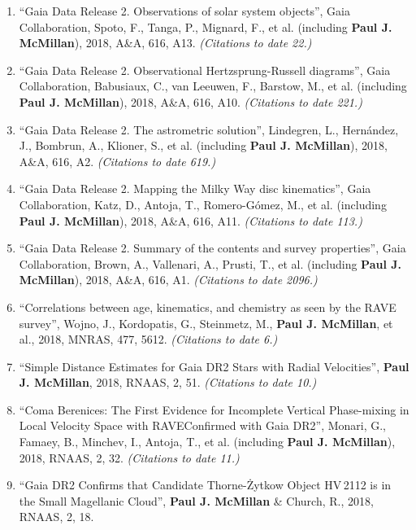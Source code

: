\documentclass{resume}
\begin{document}
\begin{enumerate}
\item ``Gaia Data Release 2. Observations of solar system objects'', Gaia Collaboration, Spoto, F., Tanga, P., Mignard, F., et al. (including \textbf{Paul J. McMillan}), 2018, A\&A, 616, A13. \textit{(Citations to date 22.)}

\item ``Gaia Data Release 2. Observational Hertzsprung-Russell diagrams'', Gaia Collaboration, Babusiaux, C., van Leeuwen, F., Barstow, M., et al. (including \textbf{Paul J. McMillan}), 2018, A\&A, 616, A10. \textit{(Citations to date 221.)}

\item ``Gaia Data Release 2. The astrometric solution'', Lindegren, L., Hern\'andez, J., Bombrun, A., Klioner, S., et al. (including \textbf{Paul J. McMillan}), 2018, A\&A, 616, A2. \textit{(Citations to date 619.)}

\item ``Gaia Data Release 2. Mapping the Milky Way disc kinematics'', Gaia Collaboration, Katz, D., Antoja, T., Romero-G\'omez, M., et al. (including \textbf{Paul J. McMillan}), 2018, A\&A, 616, A11. \textit{(Citations to date 113.)}

\item ``Gaia Data Release 2. Summary of the contents and survey properties'', Gaia Collaboration, Brown, A., Vallenari, A., Prusti, T., et al. (including \textbf{Paul J. McMillan}), 2018, A\&A, 616, A1. \textit{(Citations to date 2096.)}

\item ``Correlations between age, kinematics, and chemistry as seen by the RAVE survey'', Wojno, J., Kordopatis, G., Steinmetz, M., \textbf{Paul J. McMillan}, et al., 2018, MNRAS, 477, 5612. \textit{(Citations to date 6.)}

\item ``Simple Distance Estimates for Gaia DR2 Stars with Radial Velocities'', \textbf{Paul J. McMillan}, 2018, RNAAS, 2, 51. \textit{(Citations to date 10.)}

\item ``Coma Berenices: The First Evidence for Incomplete Vertical Phase-mixing in Local Velocity Space with RAVE{\textemdash}Confirmed with Gaia DR2'', Monari, G., Famaey, B., Minchev, I., Antoja, T., et al. (including \textbf{Paul J. McMillan}), 2018, RNAAS, 2, 32. \textit{(Citations to date 11.)}

\item ``Gaia DR2 Confirms that Candidate Thorne-\.Zytkow Object HV\,2112 is in the Small Magellanic Cloud'', \textbf{Paul J. McMillan} \& Church, R., 2018, RNAAS, 2, 18.


\end{enumerate}
\end{document}
